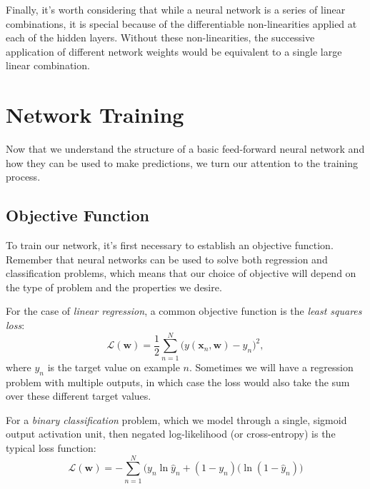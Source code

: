 Finally, it's worth considering that while a neural network is a series of linear combinations, it is special because of the differentiable non-linearities applied at each of the hidden layers. Without these non-linearities, the successive application of different network weights would be equivalent to a single large linear combination.


\section{Network Training}
Now that we understand the structure of a basic feed-forward neural network and how they can be used to make predictions, we turn our attention to the training process.

\subsection{Objective Function}

To train our network, it's first necessary to establish an objective function. Remember that neural networks can be used to solve both regression and classification problems, which means that our choice of objective will depend on the type of problem and the properties we desire.

For the case of {\em linear regression}, a common objective function is the {\em least squares loss}:
%
\begin{equation} \label{least-squares-loss-function}
	\mathcal{L}(\textbf{w}) = \frac{1}{2} \sum_{n=1}^{N} \bigg(y(\textbf{x}_{n}, \textbf{w}) - y_n\bigg)^{2},
      \end{equation}
      where $y_n$ is the target value on example $n$. Sometimes we will have a regression problem with multiple outputs, in which case the loss would also take the sum over these different target values.
      
      For a {\em binary classification} problem, which we model through a single, sigmoid output activation unit,
     then  negated log-likelihood (or cross-entropy) is the typical  loss function:
\begin{equation} \label{cross-entropy-loss-function}
	\mathcal{L}(\textbf{w}) = - \sum_{n=1}^{N} \bigg(y_{n}\ln{\hat{y}_{n}} + (1 - y_{n})(\ln{(1 - \hat{y}_{n})}\bigg)
      \end{equation}
      
